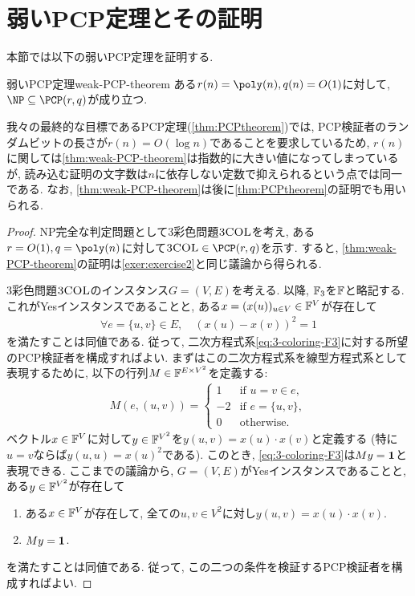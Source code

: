 \section{弱いPCP定理とその証明}
本節では以下の弱いPCP定理を証明する.
\begin{theorem}{弱いPCP定理}{weak-PCP-theorem}
  ある$r(n)=\poly(n),q(n)=O(1)$に対して, $\NP \subseteq \PCP(r,q)$が成り立つ.
\end{theorem}

我々の最終的な目標であるPCP定理(\cref{thm:PCPtheorem})では, PCP検証者のランダムビットの長さが$r(n)=O(\log n)$であることを要求しているため, $r(n)$に関しては\cref{thm:weak-PCP-theorem}は指数的に大きい値になってしまっているが, 読み込む証明の文字数は$n$に依存しない定数で抑えられるという点では同一である.
なお, \cref{thm:weak-PCP-theorem}は後に\cref{thm:PCPtheorem}の証明でも用いられる.

\begin{proof}
  NP完全な判定問題として3彩色問題$\textsc{3COL}$を考え, ある$r=O(1),q=\poly(n)$に対して$\ThreeCOL\in\PCP(r,q)$を示す.
  すると, \cref{thm:weak-PCP-theorem}の証明は\cref{exer:exercise2}と同じ議論から得られる.

  3彩色問題$\textsc{3COL}$のインスタンス$G=(V,E)$を考える.
  以降, $\mathbb{F}_3$を$\mathbb{F}$と略記する.
  これがYesインスタンスであることと, ある$x=(x(u))_{u\in V}\in\mathbb{F}^V$が存在して
  \begin{align}
    \forall e=\{u,v\}\in E, \quad (x(u) - x(v))^2 = 1 \label{eq:3-coloring-F3}
  \end{align}
  を満たすことは同値である. 従って, 二次方程式系\cref{eq:3-coloring-F3}に対する所望のPCP検証者を構成すればよい.
  まずはこの二次方程式系を線型方程式系として表現するために, 以下の行列$M \in \mathbb{F}^{E \times V^2}$を定義する:
  \begin{align*}
    M(e, (u,v)) = \begin{cases}
      1 & \text{if } u=v\in e,\\
      -2 & \text{if } e=\{u,v\},\\
      0 & \text{otherwise}.
    \end{cases}
  \end{align*}
  ベクトル$x\in\mathbb{F}^V$に対して$y\in\mathbb{F}^{V^2}$を$y(u,v)=x(u)\cdot x(v)$と定義する (特に$u=v$ならば$y(u,u)=x(u)^2$である).
  このとき, \cref{eq:3-coloring-F3}は$My=\mathbf{1}$と表現できる.
  ここまでの議論から, $G=(V,E)$がYesインスタンスであることと, ある$y\in \mathbb{F}^{V^2}$が存在して
  \begin{enumerate}
    \item ある$x\in\mathbb{F}^V$が存在して, 全ての$u,v\in V^2$に対し$y(u,v)=x(u)\cdot x(v)$.
    \item $My=\mathbf{1}$.
  \end{enumerate}
  を満たすことは同値である.
  従って, この二つの条件を検証するPCP検証者を構成すればよい.
  
  

\end{proof}

